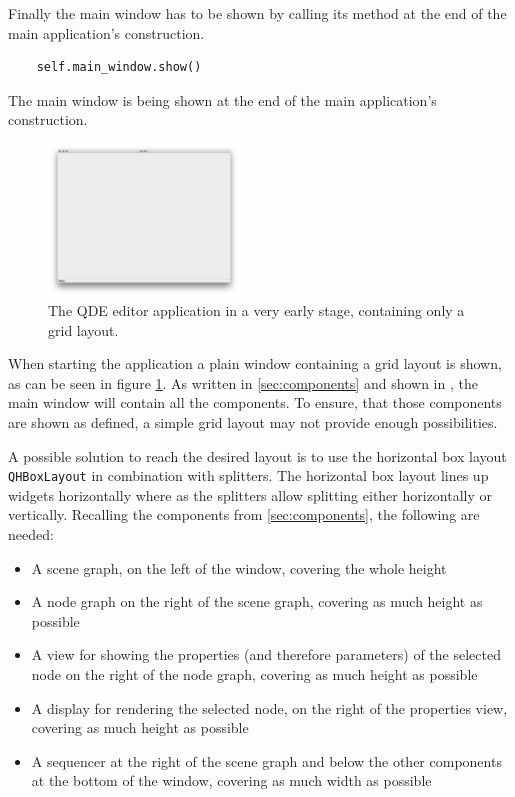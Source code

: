 \documentclass[10pt, openright, notitlepage]{scrreprt}
\newcommand{\myverb}{\collectverb{\fcolorbox{black!50}{black!25}}}
\begin{document}
Finally the main window has to be shown by calling its \myverb{show} method
at the end of the main application's construction.

\begin{listing}[H]
\begin{verbatim}
    self.main_window.show()
\end{verbatim}
\caption{\label{app-constructor}
The main window is being shown at the end of the main application's construction.}
\end{listing}

\begin{figure}[H]
\centering
\includegraphics[width=2in]{./images/qde_alpha_01.png}
\caption{\label{fig:editor-alpha-01}
The QDE editor application in a very early stage, containing only a grid layout.}
\end{figure}

When starting the application a plain window containing a grid layout is shown,
as can be seen in figure \ref{fig:editor-alpha-01}. As written in \ref{sec:components} and
shown in \citep[p. 29 ff.]{osterwalder_qde_2016}, the main window will contain all
the components. To ensure, that those components are shown as defined, a simple
grid layout may not provide enough possibilities.

A possible solution to reach the desired layout is to use the horizontal box
layout \texttt{QHBoxLayout} in combination with splitters. The horizontal box layout
lines up widgets horizontally where as the splitters allow splitting either
horizontally or vertically. Recalling the components from \ref{sec:components}, the following are needed:

\begin{itemize}
\item A scene graph, on the left of the window, covering the whole height
\item A node graph on the right of the scene graph, covering as much height as
possible
\item A view for showing the properties (and therefore parameters) of the selected
node on the right of the node graph, covering as much height as possible
\item A display for rendering the selected node, on the right of the properties
view, covering as much height as possible
\item A sequencer at the right of the scene graph and below the other components at
the bottom of the window, covering as much width as possible
\end{itemize}
\end{document}
